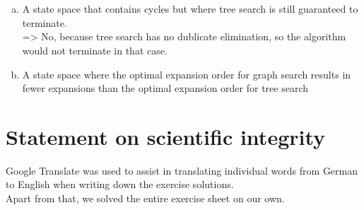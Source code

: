 \documentclass{article} %
\begin{document}
\section{}
    \begin{enumerate}[a)]
        \item A state space that contains cycles but where tree search is still guaranteed to terminate. \\=> No, because tree search has no dublicate elimination, so the algorithm would not terminate in that case.
        \item  A state space where the optimal expansion order for graph search results in fewer expansions than the optimal expansion order for tree search \\
    \end{enumerate}
\section{}

\section{}

\section*{Statement on scientific integrity}
Google Translate was used to assist in translating individual words from
German to English when writing down the exercise solutions.\\
Apart from that, we solved the entire exercise sheet on our own. 
\end{document}
